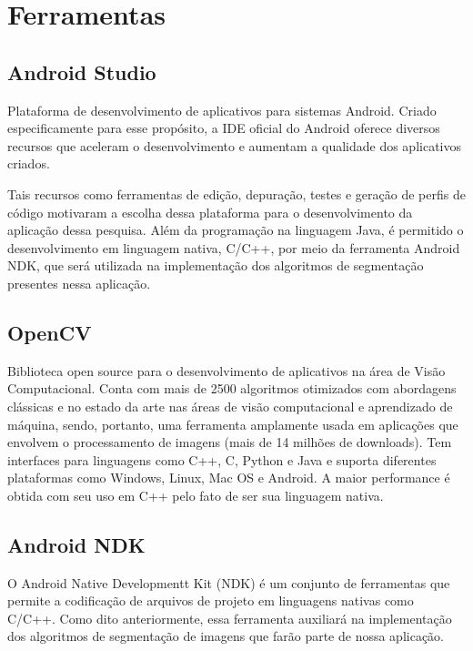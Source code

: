  


\chapter{Ferramentas}

\section{Android Studio}
Plataforma de desenvolvimento de aplicativos para sistemas Android. Criado especificamente para esse propósito, a IDE oficial do Android oferece diversos recursos que aceleram o desenvolvimento e aumentam a qualidade dos aplicativos criados.

Tais recursos como ferramentas de edição, depuração, testes e geração de perfis de código motivaram a escolha dessa plataforma para o desenvolvimento da aplicação dessa pesquisa. Além da programação na linguagem Java, é permitido o desenvolvimento em linguagem nativa, C/C++, por meio da ferramenta Android NDK, que será utilizada na implementação dos algoritmos de segmentação presentes nessa aplicação\citep{androidstudio}.



\section{OpenCV}
Biblioteca open source para o desenvolvimento de aplicativos na área de Visão Computacional. Conta com mais de 2500 algoritmos otimizados com abordagens clássicas e no estado da arte nas áreas de visão computacional e aprendizado de máquina, sendo, portanto, uma ferramenta amplamente usada em aplicações que envolvem o processamento de imagens (mais de 14 milhões de downloads). Tem interfaces para linguagens como C++, C, Python e Java e suporta diferentes plataformas como Windows, Linux, Mac OS e Android. A maior performance é obtida com seu uso em C++ pelo fato de ser sua linguagem nativa.\citep{opencv}

\section{Android NDK}
O Android Native Developmentt Kit (NDK) é um conjunto de ferramentas que permite a codificação de arquivos de projeto em linguagens nativas como C/C++. Como dito anteriormente, essa ferramenta auxiliará na implementação dos algoritmos de segmentação de imagens que farão parte de nossa aplicação.\citep{ndk}


